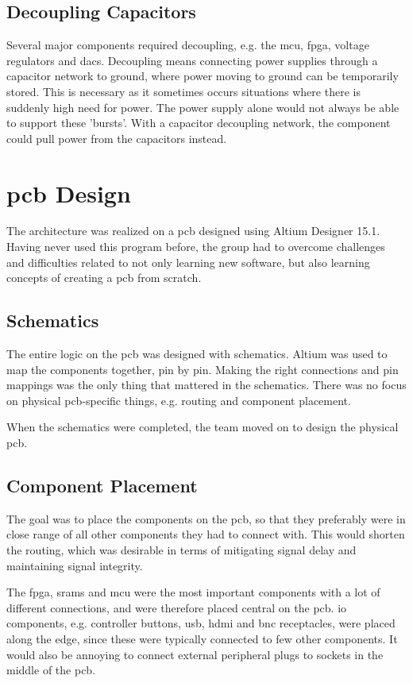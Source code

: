 \subsection{Decoupling Capacitors}
Several major components required decoupling, e.g. the \gls{mcu}, \gls{fpga}, voltage regulators and \gls{dac}s.
Decoupling means connecting power supplies through a capacitor network to ground, where power moving to ground can be temporarily stored.
This is necessary as it sometimes occurs situations where there is suddenly high need for power.
The power supply alone would not always be able to support these 'bursts'.
With a capacitor decoupling network, the component could pull power from the capacitors instead.

\section{\gls{pcb} Design}
The architecture was realized on a \gls{pcb} designed using Altium Designer 15.1.
Having never used this program before, the group had to overcome challenges and difficulties related to not only learning new software, but also learning concepts of creating a \gls{pcb} from scratch.

\subsection{Schematics}
The entire logic on the \gls{pcb} was designed with schematics.
Altium was used to map the components together, pin by pin.
Making the right connections and pin mappings was the only thing that mattered in the schematics.
There was no focus on physical \gls{pcb}-specific things, e.g. routing and component placement.

When the schematics were completed, the team moved on to design the physical \gls{pcb}.

\subsection{Component Placement}
The goal was to place the components on the \gls{pcb}, so that they preferably were in close range of all other components they had to connect with.
This would shorten the routing, which was desirable in terms of mitigating signal delay and maintaining signal integrity.

The \gls{fpga}, \gls{sram}s and \gls{mcu} were the most important components with a lot of different connections, and were therefore placed central on the \gls{pcb}.
\gls{io} components, e.g. controller buttons, \gls{usb}, \gls{hdmi} and \gls{bnc} receptacles, were placed along the edge, since these were typically connected to few other components.
It would also be annoying to connect external peripheral plugs to sockets in the middle of the \gls{pcb}.

